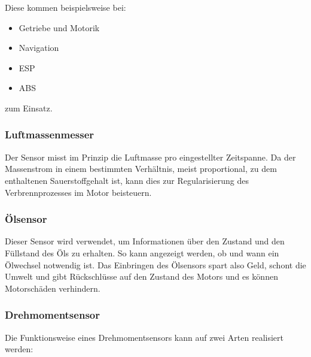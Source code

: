 					Diese kommen beispielsweise bei:
		           	\begin{itemize}
		           		\item Getriebe und Motorik
		           		\item Navigation
		           		\item ESP
		           		\item ABS
		           	\end{itemize}
					
					zum Einsatz.	          		
	          		
	          
	           \subsubsection{Luftmassenmesser}
	           
	            Der Sensor misst im Prinzip die Luftmasse pro eingestellter Zeitspanne. Da der Massenstrom in einem bestimmten Verhältnis, meist proportional, zu dem enthaltenen Sauerstoffgehalt ist, kann dies zur Regularisierung des Verbrennprozesses im Motor beisteuern.
	           
	            \subsubsection{Ölsensor}
						
	            Dieser Sensor wird verwendet, um Informationen über den Zustand und den Füllstand des Öls zu erhalten. So kann angezeigt werden, ob und wann ein Ölwechsel notwendig ist. 
	            Das Einbringen des Ölsensors spart also Geld, schont die Umwelt und gibt Rückschlüsse auf den Zustand des Motors und es können Motorschäden verhindern.\cite{TS_oel}
	            
	            \subsubsection{Drehmomentsensor}
	            
	            Die Funktionsweise eines Drehmomentsensors kann auf zwei Arten realisiert werden:\\
	            

